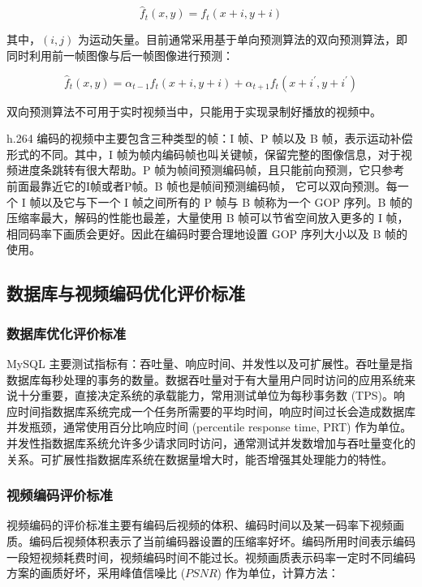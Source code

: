 \begin{equation}
\label{eq:forward_pre}
\hat{f}_{t}(x,y) = f_{t}(x+i, y+i)
\end{equation}

其中，$(i, j)$ 为运动矢量。目前通常采用基于单向预测算法的双向预测算法，即同时利用前一帧图像与后一帧图像进行预测：

\begin{equation}
\label{eq:forward_back_pre}
\hat{f}_{t}(x,y) = \alpha_{t-1}f_{t}(x+i, y+i) + \alpha_{t+1}f_{t}(x+i^{'}, y+i^{'})
\end{equation}

双向预测算法不可用于实时视频当中，只能用于实现录制好播放的视频中。

h.264 编码的视频中主要包含三种类型的帧：I 帧、P 帧以及 B 帧，表示运动补偿形式的不同。其中，I 帧为帧内编码帧也叫关键帧，保留完整的图像信息，对于视频进度条跳转有很大帮助。P 帧为帧间预测编码帧，且只能前向预测，它只参考前面最靠近它的I帧或者P帧。B 帧也是帧间预测编码帧， 它可以双向预测。每一个 I 帧以及它与下一个 I 帧之间所有的 P 帧与 B 帧称为一个 GOP 序列。B 帧的压缩率最大，解码的性能也最差，大量使用 B 帧可以节省空间放入更多的 I 帧，相同码率下画质会更好。因此在编码时要合理地设置 GOP 序列大小以及 B 帧的使用\cite{richardson2004h}。

\subsection{数据库与视频编码优化评价标准}
\subsubsection{数据库优化评价标准}
MySQL 主要测试指标有：吞吐量、响应时间、并发性以及可扩展性。吞吐量是指数据库每秒处理的事务的数量。数据吞吐量对于有大量用户同时访问的应用系统来说十分重要，直接决定系统的承载能力，常用测试单位为每秒事务数 (TPS)。响应时间指数据库系统完成一个任务所需要的平均时间，响应时间过长会造成数据库并发瓶颈，通常使用百分比响应时间 (percentile response time, PRT) 作为单位。并发性指数据库系统允许多少请求同时访问，通常测试并发数增加与吞吐量变化的关系。可扩展性指数据库系统在数据量增大时，能否增强其处理能力的特性\cite{schwartz2012high}。

\subsubsection{视频编码评价标准}

视频编码的评价标准主要有编码后视频的体积、编码时间以及某一码率下视频画质。编码后视频体积表示了当前编码器设置的压缩率好坏。编码所用时间表示编码一段短视频耗费时间，视频编码时间不能过长。视频画质表示码率一定时不同编码方案的画质好坏，采用峰值信噪比 ($PSNR$) 作为单位\cite{毕厚杰2005新一代视频压缩编码标准}，计算方法：

